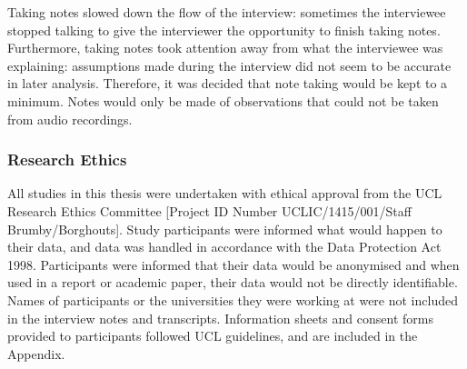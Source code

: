 Taking notes slowed down the flow of the interview: sometimes the interviewee stopped talking to give the interviewer the opportunity to finish taking notes. Furthermore, taking notes took attention away from what the interviewee was explaining: assumptions made during the interview did not seem to be accurate in later analysis. Therefore, it was decided that note taking would be kept to a minimum. Notes would only be made of observations that could not be taken from audio recordings.


\subsubsection{Research Ethics}
All studies in this thesis were undertaken with ethical approval from the UCL Research Ethics Committee [Project ID Number UCLIC/1415/001/Staff Brumby/Borghouts]. Study participants were informed what would happen to their data, and data was handled in accordance with the Data Protection Act 1998. Participants were informed that their data would be anonymised and when used in a report or academic paper, their data would not be directly identifiable. Names of participants or the universities they were working at were not included in the interview notes and transcripts. Information sheets and consent forms provided to participants followed UCL guidelines, and are included in the Appendix. 

